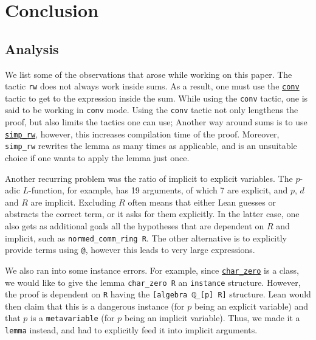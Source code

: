 \documentclass[a4paper,UKenglish,cleveref, autoref, thm-restate]{lipics-v2021}
\newcommand{\lean}[1]{\texttt{#1}\xspace} %
\begin{document}
\section{Conclusion}
\label{section5}
\subsection{Analysis}
We list some of the observations that arose while working on this paper. 
\newline
The tactic \lean{rw} does not always work inside sums. As a result, one must use 
the \href{https://leanprover-community.github.io/extras/conv.html}{\lean{conv}} tactic to get to the expression inside the sum. While using the \lean{conv} tactic, one is said to be working 
in \lean{conv} mode. Using the \lean{conv} tactic not only lengthens the proof, but also limits the tactics one can use; 
Another way around sums is to use \href{https://leanprover-community.github.io/mathlib_docs/tactics.html#simp_rw}{\lean{simp\_rw}}, 
however, this increases compilation time of the proof. Moreover, \lean{simp\_rw} rewrites the lemma as many times as applicable, and is an unsuitable choice if one wants to apply 
the lemma just once. 

Another recurring problem was the ratio of implicit to explicit variables. The $p$-adic $L$-function, for example, has 19 arguments, of which 7 are explicit, and $p$, 
$d$ and $R$ are implicit. Excluding $R$ often means that either Lean guesses or abstracts the correct term, 
or it asks for them explicitly. In the latter case, one also gets as additional goals all the hypotheses that are dependent on $R$ and implicit, such as \lean{normed\_comm\_ring R}. 
The other alternative is to explicitly provide terms using \lean{@}, however this leads to very large expressions. 

We also ran into some instance errors. For example, since \href{https://leanprover-community.github.io/mathlib_docs/algebra/char_zero/defs.html#char_zero}{\lean{char\_zero}} 
is a class, we would like to give the lemma \lean{char\_zero R} an \lean{instance} structure. 
However, the proof is dependent on \lean{R} having the \lean{[algebra ℚ\_[p] R]} structure. Lean would then claim that this is a dangerous instance 
(for $p$ being an explicit variable) and that $p$ is a \lean{metavariable} (for $p$ being an implicit variable). Thus, we made it a \lean{lemma} instead, and had to explicitly 
feed it into implicit arguments.
\end{document}
